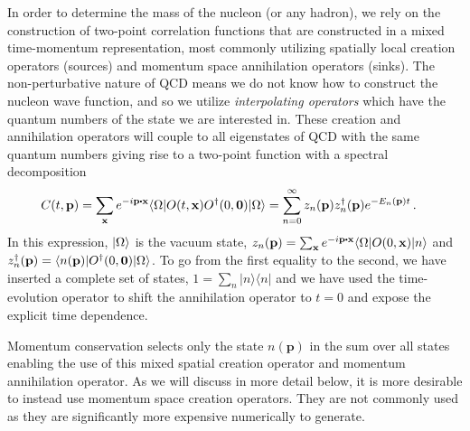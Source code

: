 In order to determine the mass of the nucleon (or any hadron), we rely on the construction of two-point correlation functions that are constructed in a mixed time-momentum representation, most commonly utilizing spatially local creation operators (sources) and momentum space annihilation operators (sinks).
The non-perturbative nature of QCD means we do not know how to construct the nucleon wave function, and so we utilize \textit{interpolating operators} which have the quantum numbers of the state we are interested in.
These creation and annihilation operators will couple to all eigenstates of QCD with the same quantum numbers giving rise to a two-point function with a spectral decomposition
\begin{align}\label{eq:2pt}
    C(t,\mathbf{p}) &= \sum_{\mathbf{x}} e^{-i \mathbf{p\dotp x}}
        \langle \O| O(t,\mathbf{x}) O^\dagger(0,\mathbf{0}) | \O \rangle
    =
    \sum_{n=0}^\infty z_n(\mathbf{p}) z_n^\dagger(\mathbf{p}) e^{-E_n(\mathbf{p})t}\, .
\end{align}
In this expression, $|\Omega\rangle$ is the vacuum state,
$z_n(\mathbf{p}) = \sum_{\mathbf{x}}e^{-i\mathbf{p\dotp x}} \langle \O|O(0,\mathbf{x})|n\rangle$
and $z_n^\dagger(\mathbf{p}) = \langle n(\mathbf{p})|O^\dagger(0,\mathbf{0})|\Omega\rangle$.
To go from the first equality to the second, we have inserted a complete set of states, $1=\sum_n |n\rangle\langle n|$ and we have used the time-evolution operator to shift the annihilation operator to $t=0$ and expose the explicit time dependence.%
\begin{marginnote}
\end{marginnote}%
Momentum conservation selects only the state $n(\mathbf{p})$ in the sum over all states enabling the use of this mixed spatial creation operator and momentum annihilation operator.
As we will discuss in more detail below, it is more desirable to instead use momentum space creation operators.
They are not commonly used as they are significantly more expensive numerically to generate.

